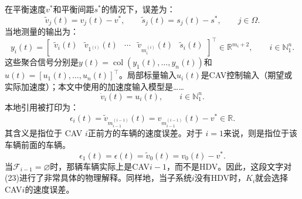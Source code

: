 \documentclass{article}
\begin{document}
在平衡速度$v^*$和平衡间距$s^*$的情况下，误差为：
\begin{equation}
\tilde v_j(t)=v_j(t)-v^*,\qquad
\tilde s_j(t)=s_j(t)-s^*,\qquad j\in\Omega. \tag{1}
\end{equation}
当地测量的输出为：
\begin{equation}
y_i(t)=\begin{bmatrix}
\tilde v_i(t)&\tilde v_{1^{(i)}}(t)&\cdots&
\tilde v_{m_i^{(i)}}(t)&\tilde s_i(t)
\end{bmatrix}^{\!\top}\in\mathbb R^{m_i+2},
\qquad i\in\mathbb N_1^n. \tag{3}
\end{equation}
这些聚合信号分别是$y(t)=\operatorname{col}(y_1(t),\ldots,y_n(t))$和$u(t)=[u_1(t),\ldots,u_n(t)]^\top$。局部标量输入$u_i(t)$是CAV控制输入（期望或实际加速度）；本文中使用的加速度输入模型是……
\begin{equation}
\dot v_i(t)=u_i(t),\qquad i\in\mathbb N_1^n. \tag{9}
\end{equation}
本地引用被打印为：
\begin{equation}
\epsilon_i(t)=\tilde v_{m_{i-1}^{(i-1)}}(t)
=v_{m_{i-1}^{(i-1)}}(t)-v^*\in\mathbb R. \tag{23}
\end{equation}
其含义是指位于 CAV $i$正前方的车辆的速度误差。对于 $i=1$来说，则是指位于该车辆前面的车辆。
\[
\epsilon_1(t)=\epsilon(t)=\tilde v_0(t)=v_0(t)-v^*.
\]
当$\mathcal F_{i-1}=\varnothing$时，那辆车辆实际上是CAV$i-1$，而不是HDV。因此，这段文字对(23)进行了非常具体的物理解释。同样地，当子系统$i$没有HDV时，$K_i$就会选择CAV$i$的速度误差。
\end{document}

